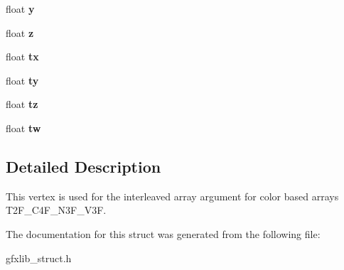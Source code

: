 \begin{DoxyCompactItemize}
\item 
float {\bfseries y}\hypertarget{structGFXColorVertex_a1edd87a102cd623ef65ba810933ed09c}{}\label{structGFXColorVertex_a1edd87a102cd623ef65ba810933ed09c}

\item 
float {\bfseries z}\hypertarget{structGFXColorVertex_a450d78a66b269d21b7dde0d1e1a2c4a9}{}\label{structGFXColorVertex_a450d78a66b269d21b7dde0d1e1a2c4a9}

\item 
float {\bfseries tx}\hypertarget{structGFXColorVertex_a57bbd2b6a415a2b054f31769d940440e}{}\label{structGFXColorVertex_a57bbd2b6a415a2b054f31769d940440e}

\item 
float {\bfseries ty}\hypertarget{structGFXColorVertex_a3604e74cd4d52156edf8a3c4e31f8f7d}{}\label{structGFXColorVertex_a3604e74cd4d52156edf8a3c4e31f8f7d}

\item 
float {\bfseries tz}\hypertarget{structGFXColorVertex_a4a869e956e547ff562bd23581b407f90}{}\label{structGFXColorVertex_a4a869e956e547ff562bd23581b407f90}

\item 
float {\bfseries tw}\hypertarget{structGFXColorVertex_aafc317c687351221d058a2771a05ac45}{}\label{structGFXColorVertex_aafc317c687351221d058a2771a05ac45}

\end{DoxyCompactItemize}


\subsection{Detailed Description}
This vertex is used for the interleaved array argument for color based arrays T2\+F\+\_\+\+C4\+F\+\_\+\+N3\+F\+\_\+\+V3F. 

The documentation for this struct was generated from the following file\+:\begin{DoxyCompactItemize}
\item 
gfxlib\+\_\+struct.\+h\end{DoxyCompactItemize}
